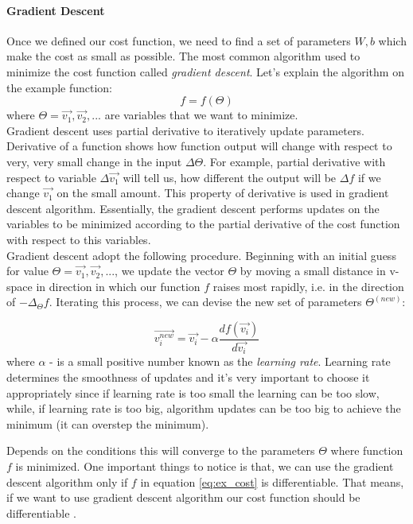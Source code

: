 \paragraph{Gradient Descent} \label{par:grad_desc}Once we defined our cost function, we need to find
a set of parameters $W, b$ which make the cost as small as possible. The most common
algorithm used to minimize the cost function called \emph{gradient descent}.
Let's explain the algorithm on the example function:
\begin{equation} \label{eq:ex_cost}
	f = f(\Theta)
\end{equation}
where $\Theta = \vec{v_1}, \vec{v_2},...$ are variables that we want to minimize.
\\
Gradient descent uses partial derivative
to iteratively update parameters. Derivative of a function shows how function output
will change with respect to very, very small change in the input $\Delta \Theta $.
For example, partial derivative with respect to variable $\Delta{\vec{v_1}}$ will tell us, how different
the output will be $\Delta f $ if we change $\vec{v_1}$ on the small amount.
This property of derivative is used in gradient descent algorithm.
Essentially, the gradient descent
performs updates on the variables to be minimized according to the partial derivative of the
cost function with respect to this variables. \\
Gradient descent adopt the following procedure.
Beginning with an initial guess for value $\Theta = \vec{v_1}, \vec{v_2}, ...$, we
update the vector $\Theta$
by moving a small distance in v-space in direction in which our function $f$ raises
most rapidly, i.e. in the direction of $- \Delta_{\Theta} f $. Iterating this process,
we can devise the new set of parameters $\Theta^{(new)}$:

\begin{equation} \label{eq:gd_update}
	\vec{v_i^{new}} = \vec{v_i} - \alpha \frac{df(\vec{v_i})}{d\vec{v_i}}
\end{equation}
where $\alpha$ - is a small positive number known as the \emph{learning rate}.
Learning rate determines the smoothness of updates and it's very important to choose
it appropriately since if learning rate is too small the learning can be too slow, while, if
learning rate is too big, algorithm updates can be too big to achieve the minimum
(it can overstep the minimum).

Depends on the conditions this will converge to the parameters $\Theta$ where function
$f$ is minimized.
One important things to notice is that, we can use the gradient descent algorithm only
if $f$ in equation \ref{eq:ex_cost} is differentiable. That means, if we want
to use gradient descent algorithm our cost function should
be differentiable \cite{Bishop1995}.


